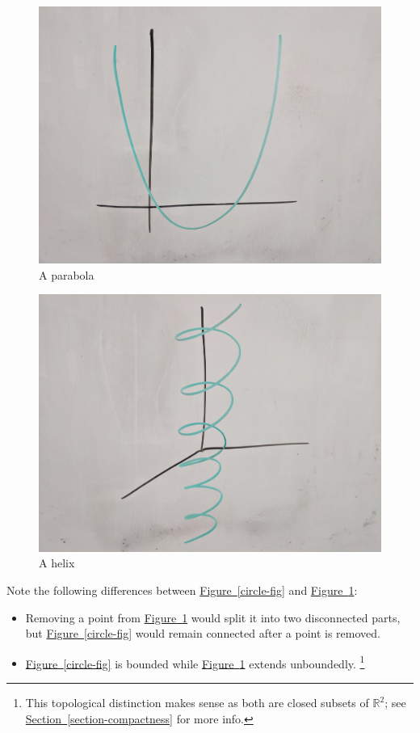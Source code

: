 \documentclass[10pt,]{article}
\begin{document}
\begin{figure}
\centering
\includegraphics[width=1\linewidth]{images/parabola.jpg}
\caption{A parabola\label{figure-parabola}}
\end{figure}
\begin{figure}
\centering
\includegraphics[width=1\linewidth]{images/helix.jpg}
\caption{A helix\label{figure-helix}}
\end{figure}
\hypertarget{p-9}{}%
Note the following differences between \hyperref[circle-fig]{Figure~\ref{circle-fig}} and \hyperref[figure-parabola]{Figure~\ref{figure-parabola}}:%
\leavevmode%
\begin{itemize}[label=\textbullet]
\item{}Removing a point from \hyperref[figure-parabola]{Figure~\ref{figure-parabola}} would split it into two disconnected parts, but \hyperref[circle-fig]{Figure~\ref{circle-fig}} would remain connected after a point is removed.%
\item{}\hyperref[circle-fig]{Figure~\ref{circle-fig}} is bounded while \hyperref[figure-parabola]{Figure~\ref{figure-parabola}} extends unboundedly. \footnote{This topological distinction makes sense as both are closed subsets of \(\mathbb R^2\); see \hyperref[section-compactness]{Section~\ref{section-compactness}} for more info.\label{fn-1}}%
\end{itemize}
\end{document}
